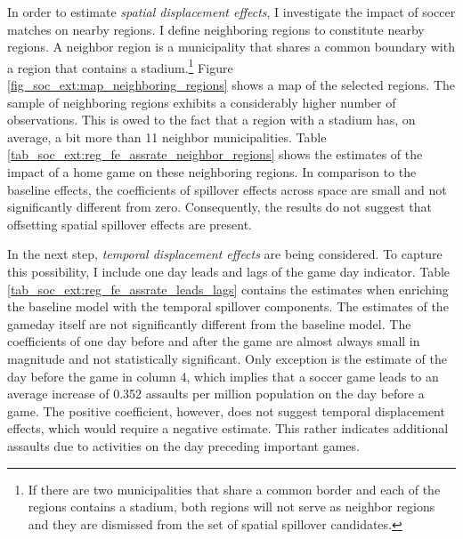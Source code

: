 \documentclass[11pt, a4paper]{article} %
\begin{document}
In order to estimate \textit{spatial displacement effects}, I investigate the impact of soccer matches on nearby regions. I define neighboring regions to constitute nearby regions. A neighbor region is a municipality that shares a common boundary with a region that contains a stadium.\footnote{If there are two municipalities that share a common border and each of the regions contains a stadium, both regions will not serve as neighbor regions and they are dismissed from the set of spatial spillover candidates.} Figure \ref{fig_soc_ext:map_neighboring_regions} shows a map of the selected regions. The sample of neighboring regions exhibits a considerably higher number of observations. This is owed to the fact that a region with a stadium has, on average, a bit more than 11 neighbor municipalities. Table \ref{tab_soc_ext:reg_fe_assrate_neighbor_regions} shows the estimates of the impact of a home game on these neighboring regions. In comparison to the baseline effects, the coefficients of spillover effects across space are small and not significantly different from zero. Consequently, the results do not suggest that offsetting spatial spillover effects are present.

In the next step, \textit{temporal displacement effects} are being considered. To capture this possibility, I include one day leads and lags of the game day indicator. Table \ref{tab_soc_ext:reg_fe_assrate_leads_lags} contains the estimates when enriching the baseline model with the temporal spillover components. The estimates of the gameday itself are not significantly different from the baseline model. The coefficients of one day before and after the game are almost always small in magnitude and not statistically significant. Only exception is the estimate of the day before the game in column 4, which implies that a soccer game leads to an average increase of 0.352 assaults per million population on the day before a game. The positive coefficient, however, does not suggest temporal displacement effects, which would require a negative estimate. This rather indicates additional assaults due to activities on the day preceding important games. 
\end{document}
